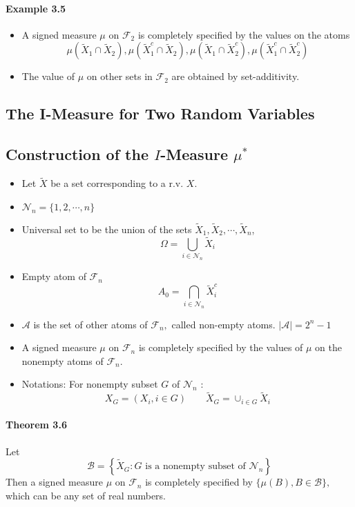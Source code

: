 \documentclass[8pt]{article}
\begin{document}
\paragraph{Example 3.5}
\begin{itemize}
	\item A signed measure $\mu$ on $\mathcal{F}_{2}$ is completely specified by the values on the atoms
	$$
	\mu\left(\tilde{X}_{1} \cap \tilde{X}_{2}\right), \mu\left(\tilde{X}_{1}^{c} \cap \tilde{X}_{2}\right), \mu\left(\tilde{X}_{1} \cap \tilde{X}_{2}^{c}\right), \mu\left(\tilde{X}_{1}^{c} \cap \tilde{X}_{2}^{c}\right)
	$$
	\item The value of $\mu$ on other sets in $\mathcal{F}_{2}$ are obtained by set-additivity.
\end{itemize}

\subsection{The I-Measure for Two Random Variables}
\subsection{Construction of the $I$-Measure $\mu^{*}$}
\begin{itemize}
	\item Let $\tilde{X}$ be a set corresponding to a r.v. $X$.
	\item $\mathcal{N}_{n}=\{1,2, \cdots, n\}$
	\item  Universal set to be the union of the sets $ \tilde{X}_1,  \tilde{X}_2, \cdots,  \tilde{X}_n$,
	$$
	\Omega=\bigcup_{i \in \mathcal{N}_{n}} \tilde{X}_{i}
	$$
	\item Empty atom of $\mathcal{F}_{n}$
	$$
	A_{0}=\bigcap_{i \in \mathcal{N}_{n}} \tilde{X}_{i}^{c}
	$$
	\item $\mathcal{A}$ is the set of other atoms of $\mathcal{F}_{n},$ called non-empty atoms. $|\mathcal{A}|=2^{n}-1$
	\item A signed measure $\mu$ on $\mathcal{F}_{n}$ is completely specified by the values of $\mu$ on the nonempty atoms of $\mathcal{F}_{n}$.
	\item Notations: For nonempty subset $G$ of $\mathcal{N}_{n}$ :
	$$X_{G}=\left(X_{i}, i \in G\right) \qquad \tilde{X}_{G}=\cup_{i \in G} \tilde{X}_{i}$$

\end{itemize}

\paragraph{Theorem 3.6} Let
$$
\mathcal{B}=\left\{\tilde{X}_{G}: G \text { is a nonempty subset of } \mathcal{N}_{n}\right\}
$$
Then a signed measure $\mu$ on $\mathcal{F}_{n}$ is completely specified by $\{\mu(B), B \in \mathcal{B}\},$ which can be any set of real numbers.
\end{document}
